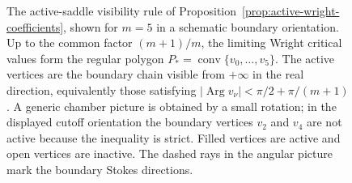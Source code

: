 \documentclass[reqno]{article}
\theoremstyle{definition}
\theoremstyle{remark}
\theoremstyle{plain}
\begin{document}
\begin{figure}[t]

\caption{The active-saddle visibility rule of Proposition~\ref{prop:active-wright-coefficients}, shown for $m=5$ in a schematic boundary orientation. Up to the common factor $(m+1)/m$, the limiting Wright critical values form the regular polygon $P_\ast=\operatorname{conv}\{v_0,\ldots,v_5\}$. The active vertices are the boundary chain visible from $+\infty$ in the real direction, equivalently those satisfying $\bigl|\operatorname{Arg} v_\nu\bigr|<\pi/2+\pi/(m+1)$. A generic chamber picture is obtained by a small rotation; in the displayed cutoff orientation the boundary vertices $v_2$ and $v_4$ are not active because the inequality is strict. Filled vertices are active and open vertices are inactive. The dashed rays in the angular picture mark the boundary Stokes directions.}
\label{fig:wright-active-visibility}
\end{figure}
\end{document}
